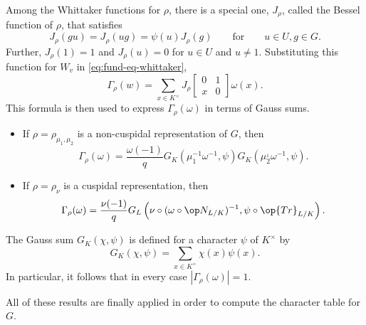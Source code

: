 \documentclass[../main.tex]{subfiles}
\begin{document}
Among the Whittaker functions for $\rho$, there is a special one, $J_\rho$, called the Bessel function of $\rho$, that satisfies
\[J_\rho(gu)=J_\rho(ug)=\psi(u)J_\rho(g)\qquad\text{for}\qquad u\in U,g\in G.\]
Further, $J_\rho(1)=1$ and $J_\rho(u)=0$ for $u\in U$ and $u\ne1$. Substituting this function for $W_v$ in \eqref{eq:fund-eq-whittaker},
\[\Gamma_\rho(w)=\sum_{x\in K^\times}J_\rho\begin{bmatrix}
	0 & 1 \\
	x & 0
\end{bmatrix}\omega(x).\]
This formula is then used to express $\Gamma_\rho(\omega)$ in terms of Gauss sums.
\begin{itemize}
	\item If $\rho=\rho_{\mu_1,\mu_2}$ is a non-cuspidal representation of $G$, then
	\[\Gamma_\rho(\omega)=\frac{\omega(-1)}qG_K\left(\mu_1^{-1}\omega^{-1},\psi\right)G_K\left(\mu_2^{_1}\omega^{-1},\psi\right).\]
	\item If $\rho=\rho_\nu$ is a cuspidal representation, then
	\[\Gamma_\rho(\omega)=\frac{\nu(-1)}qG_L\left(\nu\circ(\omega\circ{\op N_{L/K}})^{-1},\psi\circ\op{Tr}_{L/K}\right).\]
\end{itemize}
The Gauss sum $G_K(\chi,\psi)$ is defined for a character $\psi$ of $K^\times$ by
\[G_K(\chi,\psi)=\sum_{x\in K^\times}\chi(x)\psi(x).\]
In particular, it follows that in every case $|\Gamma_\rho(\omega)|=1$.

All of these results are finally applied in order to compute the character table for $G$.
\end{document}
